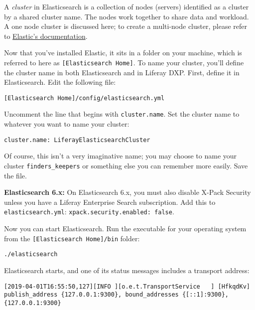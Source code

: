 A \emph{cluster} in Elasticsearch is a collection of nodes (servers)
identified as a cluster by a shared cluster name. The nodes work
together to share data and workload. A one node cluster is discussed
here; to create a multi-node cluster, please refer to
\href{https://www.elastic.co/guide/index.html}{Elastic's documentation}.

Now that you've installed Elastic, it sits in a folder on your machine,
which is referred to here as \texttt{{[}Elasticsearch\ Home{]}}. To name
your cluster, you'll define the cluster name in both Elasticsearch and
in Liferay DXP. First, define it in Elasticsearch. Edit the following
file:

\begin{verbatim}
[Elasticsearch Home]/config/elasticsearch.yml
\end{verbatim}

Uncomment the line that begins with \texttt{cluster.name}. Set the
cluster name to whatever you want to name your cluster:

\begin{verbatim}
cluster.name: LiferayElasticsearchCluster
\end{verbatim}

Of course, this isn't a very imaginative name; you may choose to name
your cluster \texttt{finders\_keepers} or something else you can
remember more easily. Save the file.

\noindent\hrulefill

\textbf{Elasticsearch 6.x:} On Elasticsearch 6.x, you must also disable
X-Pack Security unless you have a Liferay Enterprise Search
subscription. Add this to \texttt{elasticsearch.yml}:
\texttt{xpack.security.enabled:\ false}.

\noindent\hrulefill

Now you can start Elasticsearch. Run the executable for your operating
system from the \texttt{{[}Elasticsearch\ Home{]}/bin} folder:

\begin{verbatim}
./elasticsearch
\end{verbatim}

Elasticsearch starts, and one of its status messages includes a
transport address:

\begin{verbatim}
[2019-04-01T16:55:50,127][INFO ][o.e.t.TransportService   ] [HfkqdKv] publish_address {127.0.0.1:9300}, bound_addresses {[::1]:9300}, {127.0.0.1:9300}
\end{verbatim}

